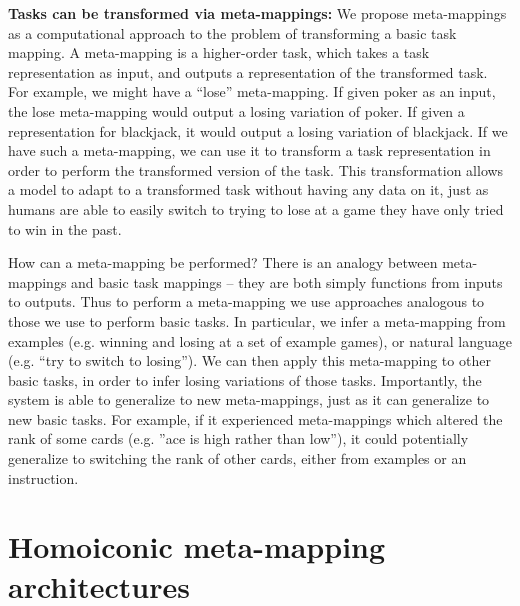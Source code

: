 \textbf{Tasks can be transformed via meta-mappings:} We propose meta-mappings as a computational approach to the problem of transforming a basic task mapping. A meta-mapping is a higher-order task, which takes a task representation as input, and outputs a representation of the transformed task. For example, we might have a ``lose'' meta-mapping. If given poker as an input, the lose meta-mapping would output a losing variation of poker. If given a representation for blackjack, it would output a losing variation of blackjack. If we have such a meta-mapping, we can use it to transform a task representation in order to perform the transformed version of the task. This transformation allows a model to adapt to a transformed task without having any data on it, just as humans are able to easily switch to trying to lose at a game they have only tried to win in the past. 

How can a meta-mapping be performed? There is an analogy between meta-mappings and basic task mappings -- they are both simply functions from inputs to outputs. Thus to perform a meta-mapping we use approaches analogous to those we use to perform basic tasks. In particular, we infer a meta-mapping from examples (e.g. winning and losing at a set of example games), or natural language (e.g. ``try to switch to losing''). We can then apply this meta-mapping to other basic tasks, in order to infer losing variations of those tasks. Importantly, the system is able to generalize to new meta-mappings, just as it can generalize to new basic tasks. For example, if it experienced meta-mappings which altered the rank of some cards (e.g. ''ace is high rather than low''), it could potentially generalize to switching the rank of other cards, either from examples or an instruction.



\section{Homoiconic meta-mapping architectures} \label{sec:HoMM:architecture}

